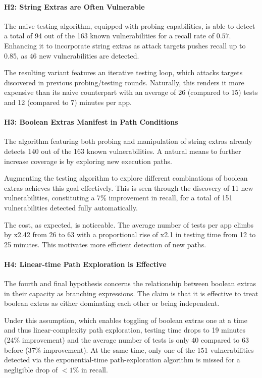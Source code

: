 \paragraph{H2: String Extras are Often Vulnerable} The naive testing algorithm, equipped with probing capabilities, is able to detect a total of 94 out of the 163 known vulnerabilities for a recall rate of $0.57$. Enhancing it to incorporate string extras as attack targets pushes recall up to 0.85, as 46 new vulnerabilities are detected.

The resulting variant features an iterative testing loop, which attacks targets discovered in previous probing/testing rounds. Naturally, this renders it more expensive than its naive counterpart with an average of 26 (compared to 15) tests and 12 (compared to 7) minutes per app.

\paragraph{H3: Boolean Extras Manifest in Path Conditions} The algorithm featuring both probing and manipulation of string extras already detects 140 out of the 163 known vulnerabilities. A natural means to further increase coverage is by exploring new execution paths.

Augmenting the testing algorithm to explore different combinations of boolean extras achieves this goal effectively. This is seen through the discovery of 11 new vulnerabilities, constituting a 7\% improvement in recall, for a total of 151 vulnerabilities detected fully automatically. 

The cost, as expected, is noticeable. The average number of tests per app climbs by x2.42 from 26 to 63 with a proportional rise of x2.1 in testing time from 12 to 25 minutes. This motivates more efficient detection of new paths.

\paragraph{H4: Linear-time Path Exploration is Effective} The fourth and final hypothesis concerns the relationship between boolean extras in their capacity as branching expressions. The claim is that it is effective to treat boolean extras as either dominating each other or being independent.

Under this assumption, which enables toggling of boolean extras one at a time and thus linear-complexity path exploration, testing time drops to 19 minutes (24\% improvement) and the average number of tests is only 40 compared to 63 before (37\% improvement). At the same time, only one of the 151 vulnerabilities detected via the exponential-time path-exploration algorithm is missed for a negligible drop of $<1$\% in recall.

